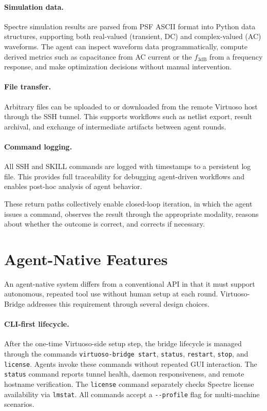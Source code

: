 \documentclass[lettersize,journal]{ieee_template/IEEEtran}
\begin{document}
\paragraph{Simulation data.} Spectre simulation results are parsed from PSF ASCII format into Python data structures, supporting both real-valued (transient, DC) and complex-valued (AC) waveforms. The agent can inspect waveform data programmatically, compute derived metrics such as capacitance from AC current or the $f_\mathrm{3dB}$ from a frequency response, and make optimization decisions without manual intervention.

\paragraph{File transfer.} Arbitrary files can be uploaded to or downloaded from the remote Virtuoso host through the SSH tunnel. This supports workflows such as netlist export, result archival, and exchange of intermediate artifacts between agent rounds.

\paragraph{Command logging.} All SSH and SKILL commands are logged with timestamps to a persistent log file. This provides full traceability for debugging agent-driven workflows and enables post-hoc analysis of agent behavior.

These return paths collectively enable closed-loop iteration, in which the agent issues a command, observes the result through the appropriate modality, reasons about whether the outcome is correct, and corrects if necessary.

\section{Agent-Native Features}

An agent-native system differs from a conventional API in that it must support autonomous, repeated tool use without human setup at each round. Virtuoso-Bridge addresses this requirement through several design choices.

\paragraph{CLI-first lifecycle.} After the one-time Virtuoso-side setup step, the bridge lifecycle is managed through the commands \texttt{virtuoso-bridge start}, \texttt{status}, \texttt{restart}, \texttt{stop}, and \texttt{license}. Agents invoke these commands without repeated GUI interaction. The \texttt{status} command reports tunnel health, daemon responsiveness, and remote hostname verification. The \texttt{license} command separately checks Spectre license availability via \texttt{lmstat}. All commands accept a \texttt{-{}-profile} flag for multi-machine scenarios.
\end{document}

